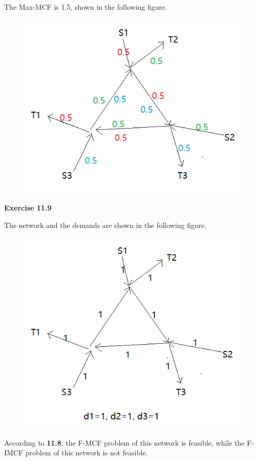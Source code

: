 \documentclass{article} %
\begin{document}
  	The Max-MCF is 1.5, shown in the following figure.
  	\begin{figure}[H]
  	\centering
  	\includegraphics[scale=0.5]{8-3.png}
  	\caption{}
  	\label{}
  	\end{figure}


 \textbf{Exercise 11.9}\par
	The network and the demands are shown in the following figure.
	\begin{figure}[H]
  	\centering
  	\includegraphics[scale=0.5]{9.png}
  	\caption{}
  	\label{}
  	\end{figure}
  	According to \textbf{11.8}, the F-MCF problem of this network is feasible, while the F-IMCF problem of this network is not feasible.\par
\end{document}
